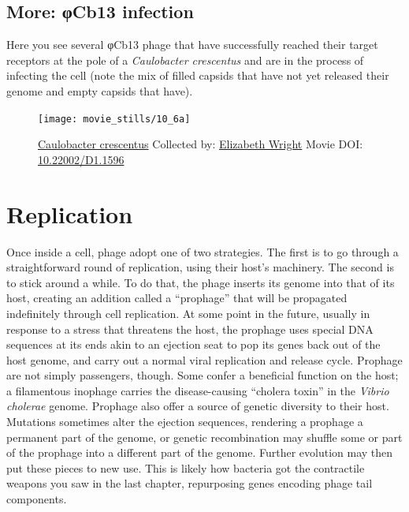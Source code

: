 \documentclass[]{tufte-book}
\begin{document}
\hypertarget{ux3c6Cb13_infection}{\subsection*{More: φCb13
infection}\label{ux3c6Cb13_infection}}

Here you see several φCb13 phage that have successfully reached their
target receptors at the pole of a \emph{Caulobacter crescentus} and are
in the process of infecting the cell (note the mix of filled capsids
that have not yet released their genome and empty capsids that have).





\begin{figure}
\texttt{[image: movie\_stills/10\_6a]} \caption[\protect\hyperlink{tree}{Caulobacter crescentus} Collected
by: \protect\hyperlink{elizabeth_wright}{Elizabeth Wright} Movie DOI:
\href{https://doi.org/10.22002/D1.1596}{10.22002/D1.1596}]{\protect\hyperlink{tree}{Caulobacter crescentus} Collected
by: \protect\hyperlink{elizabeth_wright}{Elizabeth Wright} Movie DOI:
\href{https://doi.org/10.22002/D1.1596}{10.22002/D1.1596}}\label{fig:10-6a}
\end{figure}

\section{Replication}\label{replication}

Once inside a cell, phage adopt one of two strategies. The first is to
go through a straightforward round of replication, using their host's
machinery. The second is to stick around a while. To do that, the phage
inserts its genome into that of its host, creating an addition called a
``prophage'' that will be propagated indefinitely through cell
replication. At some point in the future, usually in response to a
stress that threatens the host, the prophage uses special DNA sequences
at its ends akin to an ejection seat to pop its genes back out of the
host genome, and carry out a normal viral replication and release cycle.
Prophage are not simply passengers, though. Some confer a beneficial
function on the host; a filamentous inophage carries the disease-causing
``cholera toxin'' in the \emph{Vibrio cholerae} genome. Prophage also
offer a source of genetic diversity to their host. Mutations sometimes
alter the ejection sequences, rendering a prophage a permanent part of
the genome, or genetic recombination may shuffle some or part of the
prophage into a different part of the genome. Further evolution may then
put these pieces to new use. This is likely how bacteria got the
contractile weapons you saw in the last chapter, repurposing genes
encoding phage tail components.
\end{document}
